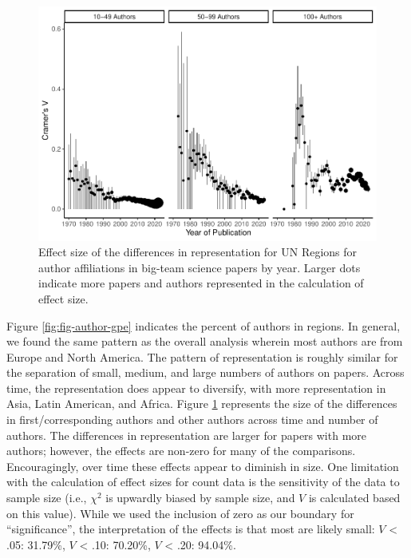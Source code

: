 \documentclass[
  man,floatsintext]{apa6}
\begin{document}
\begin{figure}
\centering
\includegraphics{manuscript_scopus_files/figure-latex/fig-effect-gpe-1.pdf}
\caption{\label{fig:fig-effect-gpe}Effect size of the differences in representation for UN Regions for author affiliations in big-team science papers by year. Larger dots indicate more papers and authors represented in the calculation of effect size.}
\end{figure}

Figure \ref{fig:fig-author-gpe} indicates the percent of authors in
regions. In general, we found the same pattern as the overall analysis
wherein most authors are from Europe and North America. The pattern of
representation is roughly similar for the separation of small, medium,
and large numbers of authors on papers. Across time, the representation
does appear to diversify, with more representation in Asia, Latin
American, and Africa. Figure \ref{fig:fig-effect-gpe} represents the
size of the differences in first/corresponding authors and other authors
across time and number of authors. The differences in representation are
larger for papers with more authors; however, the effects are non-zero
for many of the comparisons. Encouragingly, over time these effects
appear to diminish in size. One limitation with the calculation of
effect sizes for count data is the sensitivity of the data to sample
size (i.e., \(\chi^2\) is upwardly biased by sample size, and \(V\) is
calculated based on this value). While we used the inclusion of zero as
our boundary for ``significance'', the interpretation of the effects is
that most are likely small: \(V\) \textless{} .05:
31.79\%, \(V\) \textless{} .10:
70.20\%, \(V\) \textless{}
.20: 94.04\%.
\end{document}
